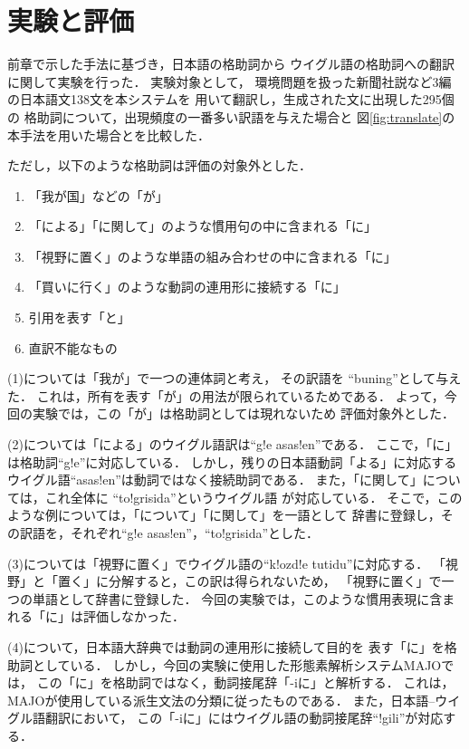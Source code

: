 \section{実験と評価} \label{prexpr}
前章で示した手法に基づき，日本語の格助詞から
ウイグル語の格助詞への翻訳に関して実験を行った．
実験対象として，
環境問題を扱った新聞社説など3編の日本語文138文を本システムを
用いて翻訳し，生成された文に出現した295個の
格助詞について，出現頻度の一番多い訳語を与えた場合と
図\ref{fig:translate}の本手法を用いた場合とを比較した．

ただし，以下のような格助詞は評価の対象外とした．
\begin{enumerate}
 \item 「我が国」などの「が」
 \item 「による」「に関して」のような慣用句の中に含まれる「に」
 \item 「視野に置く」のような単語の組み合わせの中に含まれる「に」
 \item 「買いに行く」のような動詞の連用形に接続する「に」
 \item 引用を表す「と」
 \item 直訳不能なもの
\end{enumerate}

(1)については「我が」で一つの連体詞と考え，
その訳語を ``buning''として与えた．
これは，所有を表す「が」の用法が限られているためである．
よって，今回の実験では，この「が」は格助詞としては現れないため
評価対象外とした．

(2)については「による」のウイグル語訳は``g!e asas!en''である．
ここで，「に」は格助詞``g!e''に対応している．
しかし，残りの日本語動詞「よる」に対応する
ウイグル語``asas!en''は動詞ではなく接続助詞である．
また，「に関して」については，これ全体に ``to!grisida''というウイグル語
が対応している．
そこで，このような例については，「について」「に関して」を一語として
辞書に登録し，その訳語を，それぞれ``g!e asas!en''，``to!grisida''とした．

(3)については「視野に置く」でウイグル語の``k!ozd!e tutidu''に対応する．
「視野」と「置く」に分解すると，この訳は得られないため，
「視野に置く」で一つの単語として辞書に登録した．
今回の実験では，このような慣用表現に含まれる「に」は評価しなかった．

(4)について，日本語大辞典\cite{GDIC}では動詞の連用形に接続して目的を
表す「に」を格助詞としている．
しかし，今回の実験に使用した形態素解析システムMAJOでは，
この「に」を格助詞ではなく，動詞接尾辞「-iに」と解析する．
これは，MAJOが使用している派生文法の分類に従ったものである．
また，日本語--ウイグル語翻訳において，
この「-iに」にはウイグル語の動詞接尾辞``!gili''が対応する．

